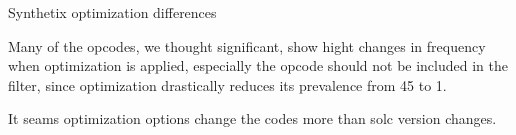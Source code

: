 \documentclass[../main.tex]{subfiles}
\begin{document}
\begin{table}[ht!]
  \centering
  \scriptsize
  \caption{Synthetix optimization differences}
  \label{tbl:opt_diff}
\end{table}

Many of the opcodes, we thought significant, show hight changes in frequency when optimization is applied, especially the  opcode should not be included in the filter, since optimization drastically reduces its prevalence from 45 to 1.

It seams optimization options change the codes more than solc version changes.
\end{document}
